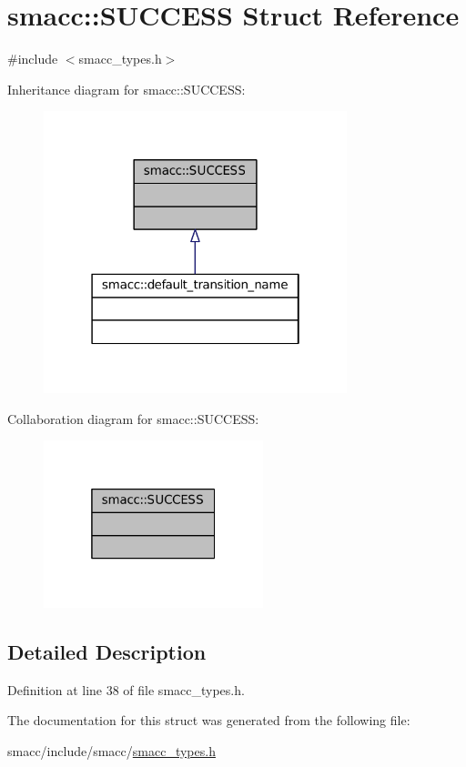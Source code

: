 \hypertarget{structsmacc_1_1SUCCESS}{}\section{smacc\+:\+:S\+U\+C\+C\+E\+SS Struct Reference}
\label{structsmacc_1_1SUCCESS}


{\ttfamily \#include $<$smacc\+\_\+types.\+h$>$}



Inheritance diagram for smacc\+:\+:S\+U\+C\+C\+E\+SS\+:
\nopagebreak
\begin{figure}[H]
\begin{center}
\leavevmode
\includegraphics[width=250pt]{structsmacc_1_1SUCCESS__inherit__graph}
\end{center}
\end{figure}


Collaboration diagram for smacc\+:\+:S\+U\+C\+C\+E\+SS\+:
\nopagebreak
\begin{figure}[H]
\begin{center}
\leavevmode
\includegraphics[width=181pt]{structsmacc_1_1SUCCESS__coll__graph}
\end{center}
\end{figure}


\subsection{Detailed Description}


Definition at line 38 of file smacc\+\_\+types.\+h.



The documentation for this struct was generated from the following file\+:\begin{DoxyCompactItemize}
\item 
smacc/include/smacc/\hyperlink{smacc__types_8h}{smacc\+\_\+types.\+h}\end{DoxyCompactItemize}

